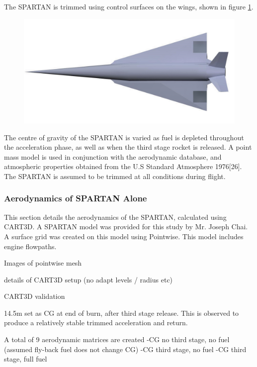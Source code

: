 The SPARTAN is trimmed using control surfaces on the wings, shown in figure \ref{fig:SPARTAN_FLAPS}. 

\begin{figure}
\centering
\includegraphics[width=0.7\linewidth]{figures/3_vehicle_design/SPARTAN_FLAPS}
\caption{}
\label{fig:SPARTAN_FLAPS}
\end{figure}


The centre of gravity of the SPARTAN is varied as fuel is depleted throughout the acceleration phase, as well as when the third stage rocket is released. A point mass model is used in conjunction with the aerodynamic database,
and atmospheric properties obtained from the U.S Standard Atmosphere 1976[26]. The SPARTAN is assumed to be
trimmed at all conditions during flight.






  \subsubsection{Aerodynamics of SPARTAN Alone}
  
This section details the aerodynamics of the SPARTAN, calculated using CART3D. A SPARTAN model was provided for this study by Mr. Joseph Chai. A surface grid was created on this model using Pointwise\cite{Pointwise}. This model includes engine flowpaths. 




Images of pointwise mesh



details of CART3D setup (no adapt levels / radius etc)


CART3D validation



14.5m set as CG at end of burn, after third stage release. This is observed to produce a relatively stable trimmed acceleration and return. 

A total of 9 aerodynamic matrices are created
-CG no third stage, no fuel (assumed fly-back fuel does not change CG)
-CG third stage, no fuel
-CG third stage, full fuel

